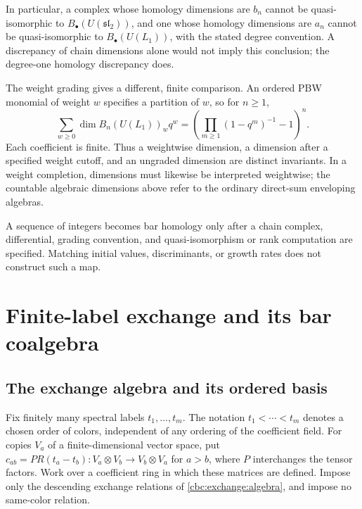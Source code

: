 In particular, a complex whose homology dimensions are $b_n$ cannot be
quasi-isomorphic to $B_\bullet(U(\mathfrak{sl}_2))$, and one whose homology
dimensions are $a_n$ cannot be quasi-isomorphic to $B_\bullet(U(L_1))$,
with the stated degree convention.  A discrepancy of chain dimensions
alone would not imply this conclusion; the degree-one homology discrepancy
does.

The weight grading gives a different, finite comparison.  An ordered PBW
monomial of weight $w$ specifies a partition of $w$, so for $n\ge1$,
\[
 \sum_{w\ge0}\dim B_n(U(L_1))_w q^w
 =\left(\prod_{m\ge1}(1-q^m)^{-1}-1\right)^n.
\]
Each coefficient is finite.  Thus a weightwise dimension, a dimension
after a specified weight cutoff, and an ungraded dimension are distinct
invariants.  In a weight completion, dimensions must likewise be interpreted
weightwise; the countable algebraic dimensions above refer to the ordinary
direct-sum enveloping algebras.

\begin{nogobox}[title={No-go theorem 15: a scalar sequence is not homology data}]
A sequence of integers becomes bar homology only after a chain complex, differential, grading convention, and quasi-isomorphism or rank computation are specified.  Matching initial values, discriminants, or growth rates does not construct such a map.
\end{nogobox}

\chapter{Finite-label exchange and its bar coalgebra}\label{chap:zf}

\section{The exchange algebra and its ordered basis}
Fix finitely many spectral labels $t_1,\ldots,t_m$.
The notation $t_1<\cdots<t_m$ denotes a chosen order of colors,
independent of any ordering of the coefficient field.  For copies $V_a$ of a finite-dimensional vector space,
put $c_{ab}=P R(t_a-t_b):V_a\otimes V_b\to V_b\otimes V_a$ for $a>b$,
where $P$ interchanges the tensor factors.  Work over a coefficient ring
in which these matrices are defined.  Impose only the descending exchange
relations of \eqref{cbc:exchange:algebra}, and impose no same-color relation.

